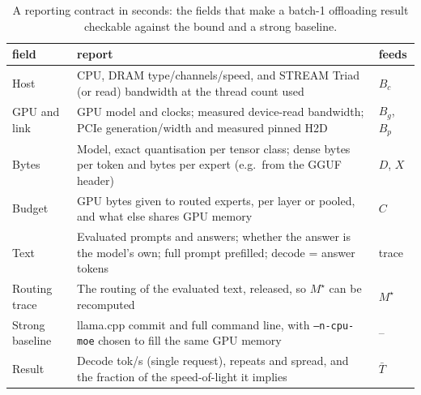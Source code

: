 \begin{table}[t]\centering\footnotesize
\caption{A reporting contract in seconds: the fields that make a batch-1 offloading result checkable against the bound and a strong baseline.}\label{tab:contract}
\begin{tabular}{p{1.45cm}p{4.9cm}l}\toprule field & report & feeds \\ \midrule
Host & CPU, DRAM type/channels/speed, and STREAM Triad (or read) bandwidth at the thread count used & $B_c$ \\
GPU and link & GPU model and clocks; measured device-read bandwidth; PCIe generation/width and measured pinned H2D & $B_g$, $B_p$ \\
Bytes & Model, exact quantisation per tensor class; dense bytes per token and bytes per expert (e.g.\ from the GGUF header) & $D$, $X$ \\
Budget & GPU bytes given to routed experts, per layer or pooled, and what else shares GPU memory & $C$ \\
Text & Evaluated prompts and answers; whether the answer is the model's own; full prompt prefilled; decode = answer tokens & trace \\
Routing trace & The routing of the evaluated text, released, so $M^\star$ can be recomputed & $M^\star$ \\
Strong baseline & llama.cpp commit and full command line, with \texttt{--n-cpu-moe} chosen to fill the same GPU memory & -- \\
Result & Decode tok/s (single request), repeats and spread, and the fraction of the speed-of-light it implies & $\bar T$ \\
\bottomrule\end{tabular}\end{table}
